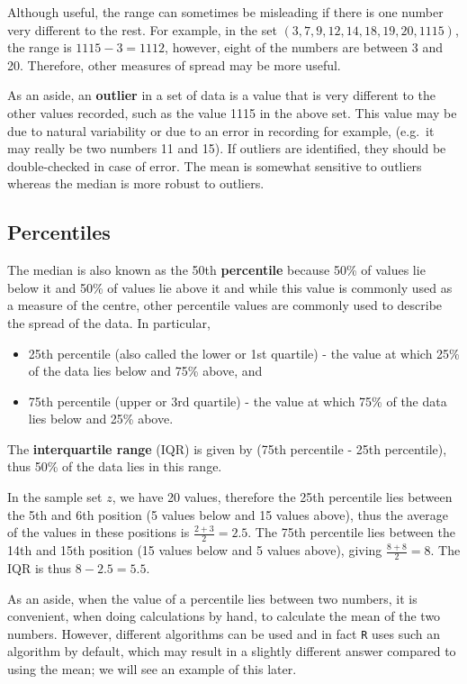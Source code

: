 \documentclass[
  oneside]{krantz}
\begin{document}
Although useful, the range can sometimes be misleading if there is one number very different to the rest. For example, in the set \((3, 7, 9, 12, 14, 18, 19, 20, 1115)\), the range is \(1115 - 3 = 1112\), however, eight of the numbers are between 3 and 20. Therefore, other measures of spread may be more useful.

As an aside, an \textbf{outlier} in a set of data is a value that is very different to the other values recorded, such as the value 1115 in the above set. This value may be due to natural variability or due to an error in recording for example, (e.g.~it may really be two numbers 11 and 15). If outliers are identified, they should be double-checked in case of error. The mean is somewhat sensitive to outliers whereas the median is more robust to outliers.

\hypertarget{percentiles}{%
\subsection{Percentiles}\label{percentiles}}

The median is also known as the 50th \textbf{percentile} because 50\% of values lie below it and 50\% of values lie above it and while this value is commonly used as a measure of the centre, other percentile values are commonly used to describe the spread of the data. In particular,

\begin{itemize}
\item
  25th percentile (also called the lower or 1st quartile) - the value at which 25\% of the data lies below and 75\% above, and
\item
  75th percentile (upper or 3rd quartile) - the value at which 75\% of the data lies below and 25\% above.
\end{itemize}

The \textbf{interquartile range} (IQR) is given by (75th percentile - 25th percentile), thus 50\% of the data lies in this range.

In the sample set \(z\), we have 20 values, therefore the 25th percentile lies between the 5th and 6th position (5 values below and 15 values above), thus the average of the values in these positions is \(\frac{2+3}2 = 2.5\). The 75th percentile lies between the 14th and 15th position (15 values below and 5 values above), giving \(\frac{8+8}2= 8\). The IQR is thus \(8 - 2.5 = 5.5\).

As an aside, when the value of a percentile lies between two numbers, it is convenient, when doing calculations by hand, to calculate the mean of the two numbers. However, different algorithms can be used and in fact \texttt{R} uses such an algorithm by default, which may result in a slightly different answer compared to using the mean; we will see an example of this later.
\end{document}
